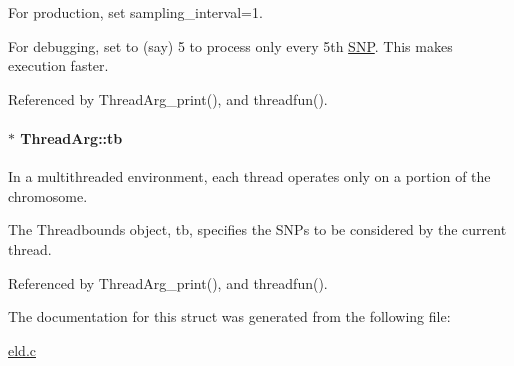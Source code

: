 For production, set sampling\+\_\+interval=1. 

For debugging, set to (say) 5 to process only every 5th \hyperlink{struct_s_n_p}{S\+N\+P}. This makes execution faster. 

Referenced by Thread\+Arg\+\_\+print(), and threadfun().

\hypertarget{struct_thread_arg_ac4848e29e694d7a9c5b0b09896cc3f37}{
\paragraph[{tb}]{$\ast$ Thread\+Arg\+::tb}}\label{struct_thread_arg_ac4848e29e694d7a9c5b0b09896cc3f37}


In a multithreaded environment, each thread operates only on a portion of the chromosome. 

The Threadbounds object, tb, specifies the S\+N\+Ps to be considered by the current thread. 

Referenced by Thread\+Arg\+\_\+print(), and threadfun().



The documentation for this struct was generated from the following file\+:\begin{DoxyCompactItemize}
\item 
\hyperlink{eld_8c}{eld.\+c}\end{DoxyCompactItemize}
